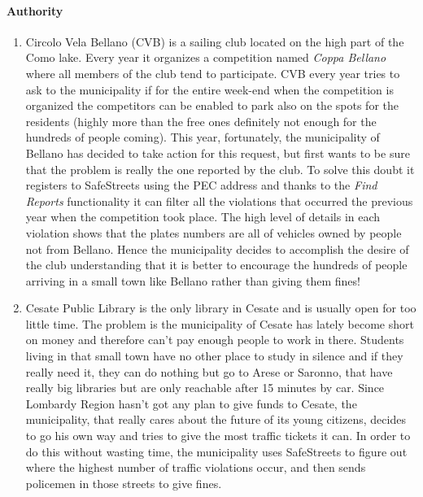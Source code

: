 		\paragraph{Authority}
		\begin{enumerate}[label=\textbf{AS\arabic*}]
			\item \label{sce:findReports} Circolo Vela Bellano (CVB) is a sailing club located on the high part of the Como lake. Every year it organizes a competition named \emph{Coppa Bellano} where all members of the club tend to participate. CVB every year tries to ask to the municipality if for the entire week-end when the competition is organized the competitors can be enabled to park also on the spots for the residents (highly more than the free ones definitely not enough for the hundreds of people coming). This year, fortunately, the municipality of Bellano has decided to take action for this request, but first wants to be sure that the problem is really the one reported by the club. To solve this doubt it registers to SafeStreets using the PEC address and thanks to the \emph{Find Reports} functionality it can filter all the violations that occurred the previous year when the competition took place. The high level of details in each violation shows that the plates numbers are all of vehicles owned by people not from Bellano. Hence the municipality decides to accomplish the desire of the club understanding that it is better to encourage the hundreds of people arriving in a small town like Bellano rather than giving them fines!
			
			\item \label{sce:basicAuthority} Cesate Public Library is the only library in Cesate and is usually open for too little time. The problem is the municipality of Cesate has lately become short on money and therefore can’t pay enough people to work in there. Students living in that small town have no other place to study in silence and if they really need it, they can do nothing but go to Arese or Saronno, that have really big libraries but are only reachable after 15 minutes by car. Since Lombardy Region hasn’t got any plan to give funds to Cesate, the municipality, that really cares about the future of its young citizens, decides to go his own way and tries to give the most traffic tickets it can. In order to do this without wasting time, the municipality uses SafeStreets to figure out where the highest number of traffic violations occur, and then sends policemen in those streets to give fines.
			

\end{enumerate}
